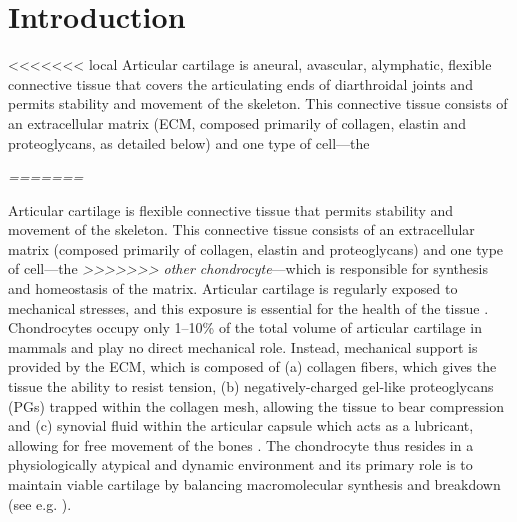 \section*{Introduction}
\label{introduction}

<<<<<<< local
Articular cartilage 
is aneural, avascular, alymphatic, flexible connective tissue that covers the
articulating ends of diarthroidal joints \citep{Poole1997,
Mankin1982} and permits
stability and movement of the skeleton. This connective tissue
consists of an extracellular matrix (ECM, composed primarily of collagen,
elastin and proteoglycans, as detailed below) and one type of cell---the {\em
=======

Articular cartilage is flexible connective tissue that permits
stability and movement of the skeleton.  This connective tissue
consists of an extracellular matrix (composed primarily of collagen,
elastin and proteoglycans) and one type of cell---the {\em
>>>>>>> other
chondrocyte}---which is responsible for synthesis and homeostasis of
the matrix. Articular cartilage is regularly exposed to
mechanical stresses, and this exposure is essential for the health of
the tissue \citep{Stockwell1991}. Chondrocytes occupy only 1--10\% of
the total volume of articular cartilage in mammals
\citep{CarneyMuir1988, Halletal1996} and play no direct mechanical
role. Instead, mechanical support is provided by the ECM, which is composed of (a) collagen
fibers, which gives the tissue the ability to resist tension, (b)
negatively-charged gel-like proteoglycans (PGs) trapped within the
collagen mesh, allowing the tissue to bear compression
\citep{Poole1997, BuckwalterMankin1998} and (c) synovial fluid within
the articular capsule which acts as a lubricant, allowing for free
movement of the bones \citep{Edwardsetal1994}. The chondrocyte thus
resides in a physiologically atypical and dynamic environment and its primary role is
to maintain viable cartilage by balancing macromolecular
synthesis and breakdown (see e.g. \citet{Wilkinsetal2000,
Stockwell1991, Fassbender1987}). 



}
